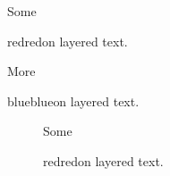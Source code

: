 \documentclass{article}
\begin{document}
Some \begin{ocg}{red}{red}{on}
{\color{red}layered text.}
\end{ocg}


\newpage

More \begin{ocg}{blue}{blue}{on}
{\color{blue}layered text.}
\end{ocg}

\begin{figure}[p]

Some \begin{ocg}{red}{red}{on}
{\color{red}layered text.}
\end{ocg}

\end{figure}
\end{document}
